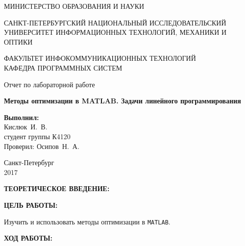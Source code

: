 \documentclass[14pt,a4paper]{extreport}
\newcommand{\header}[1]{%
{
\clearpage%
\fontsize{16pt}{14pt}\selectfont
\begin{center}
\textbf{\MakeUppercase{#1}:}
\end{center}
}
}
\newcommand{\matlab}{\texttt{\MakeUppercase{matlab}}}
\newcommand{\labyear}{2017}
\newcommand{\labtitle}{Методы оптимизации в \MakeUppercase{Matlab}. Задачи линейного программирования}
\newcommand{\prepod}{Осипов~Н.~А.}
\newcommand{\student}{Кислюк~И.~В.}
\begin{document}
	\begin{titlepage}
	\begin{center}	
		\fontsize{14pt}{14pt}\selectfont
		МИНИСТЕРСТВО ОБРАЗОВАНИЯ И НАУКИ\\

		\vspace*{0.6\baselineskip}

		\MakeUppercase{Санкт-Петербургский Национальный Исследовательский Университет Информационных технологий, механики и оптики}		
		
		\vspace*{0.6\baselineskip}
		\MakeUppercase{Факультет Инфокоммуникационных технологий}\\
		\MakeUppercase{Кафедра программных систем}
	
		\vspace*{7\baselineskip}
		\fontsize{19pt}{18pt}\selectfont
		Отчет по лабораторной работе
		
		\fontsize{20pt}{18pt}\selectfont
		\textbf{\labtitle}\\
		\vspace*{1.15\baselineskip}
		\end{center}
	
	\vspace*{2\baselineskip}
	\begin{flushright}
	\fontsize{14pt}{14pt}\selectfont
	\textbf{Выполнил:}\\
	\student\\
	студент группы К4120\\
	Проверил: \prepod\\
	\end{flushright}
	
	\vspace{\fill}
	\begin{center}
	Санкт-Петербург\\
	\vspace{-1ex}
	\labyear
	\end{center}
	
\end{titlepage}

\fontsize{14pt}{14pt}\selectfont

\header{Теоретическое введение}


\header{Цель работы}

Изучить и использовать методы оптимизации в \matlab.

\header{Ход работы}
\end{document}
